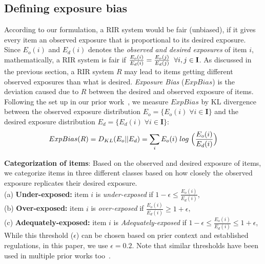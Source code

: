 \vspace{-1mm}
\subsection{Defining exposure bias}  \label{sub:exp-bias}
According to our formulation, a RIR system would be fair (unbiased), if it gives every item an observed exposure that is proportional to its desired exposure. 
Since $E_o(i)$ and $E_d(i)$ denotes the {\it observed and desired exposures} of item $i$, mathematically, a RIR system is fair if $\frac{E_o(i)}{E_d(i)} = \frac{E_o(j)}{E_d(j)} \hspace{2mm}  \forall {i, j} \in \mathbf{I}$.
As discussed in the previous section, a RIR system $R$ may lead to items getting different observed exposures than what is desired. 
{\it Exposure Bias} ($ExpBias$) is the %
deviation caused due to $R$ between the desired and observed exposure of items.
Following the set up in our prior work~\cite{dash2021umpire}, we measure $ExpBias$ by KL divergence~\cite{cha2007comprehensive} between the observed exposure distribution $E_o = \{E_o(i) \; \forall i \in \mathbf{I}\}$ and the desired exposure distribution $E_d = \{E_d(i) \; \forall i \in \mathbf{I}\}$: 
\setlength{\belowdisplayskip}{0pt} 
\setlength{\abovedisplayskip}{0pt} 
\small
\begin{align}
ExpBias(R) = D_{KL} (E_o||E_d)= \sum_{i }{E_o(i) \hspace{1mm} log \hspace{1mm} \Big(\frac{E_o(i)}{E_d(i)}\Big)}
\end{align}\normalsize


\vspace{1mm}
\noindent
\textbf{Categorization of items}:
Based on the observed and desired exposure of items, we categorize items in three different classes based on how closely the observed exposure replicates their desired exposure.\\
(a) {\bf Under-exposed:} item $i$ is \textit{under-exposed} if $1-\epsilon \leq \frac{E_o(i)}{E_d(i)}$, \\
(b) {\bf Over-exposed:} item $i$ is \textit{over-exposed} if $\frac{E_o(i)}{E_d(i)} \geq 1+\epsilon$, \\
(c) {\bf Adequately-exposed:} item $i$ is \textit{Adequately-exposed} if $1-\epsilon \leq \frac{E_o(i)}{E_d(i)} \leq 1+\epsilon$, \\
While this threshold ($\epsilon$) can be chosen based on prier context and established regulations, in this paper, we use $\epsilon=0.2$. Note that similar thresholds have been used in multiple prior works too~\cite{chakraborty2017who, dash2018beyond, dash2021umpire}. 
